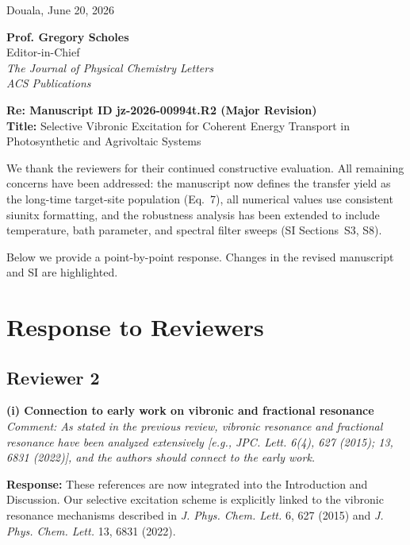 \documentclass[11pt]{article}
\begin{document}
\begin{flushright}
    Douala, June 20, 2026
\end{flushright}

\noindent \textbf{Prof. Gregory Scholes}\\
Editor-in-Chief\\
\textit{The Journal of Physical Chemistry Letters}\\
\textit{ACS Publications}

\vspace{1em}

\noindent \textbf{Re: Manuscript ID jz-2026-00994t.R2 (Major Revision)}\\
\textbf{Title:} Selective Vibronic Excitation for Coherent Energy Transport in Photosynthetic and Agrivoltaic Systems

\vspace{2em}

\noindent We thank the reviewers for their continued constructive evaluation. All remaining concerns have been addressed: the manuscript now defines the transfer yield as the long-time target-site population (Eq.~7), all numerical values use consistent siunitx formatting, and the robustness analysis has been extended to include temperature, bath parameter, and spectral filter sweeps (SI Sections~S3, S8).

Below we provide a point-by-point response. Changes in the revised manuscript and SI are highlighted.

\vspace{2em}

\section*{Response to Reviewers}

\subsection*{Reviewer 2}

\textbf{(i) Connection to early work on vibronic and fractional resonance}
\textit{Comment: As stated in the previous review, vibronic resonance and fractional resonance have been analyzed extensively [e.g., JPC. Lett. 6(4), 627 (2015); 13, 6831 (2022)], and the authors should connect to the early work.}

\textbf{Response:} These references are now integrated into the Introduction and Discussion. Our selective excitation scheme is explicitly linked to the vibronic resonance mechanisms described in \textit{J. Phys. Chem. Lett.} 6, 627 (2015) and \textit{J. Phys. Chem. Lett.} 13, 6831 (2022).
\end{document}
